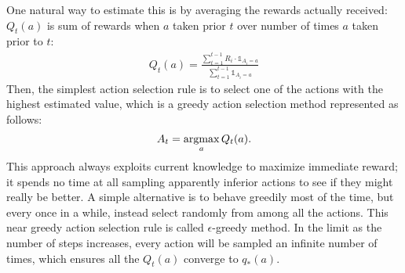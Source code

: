 One natural way to estimate this is by averaging the rewards actually received: $Q_t(a)$ is sum of rewards when $a$ taken prior $t$ over number of times $a$ taken prior to $t$:
\begin{align*}
	Q_t(a) = \frac{\sum_{t=1}^{t-1}R_i \cdot \mathds{1}_{A_i=a}}{\sum_{t=1}^{t-1}\mathds{1}_{A_i=a}}
\end{align*}
Then, the simplest action selection rule is to select one of the actions with the highest estimated value, which is a greedy action selection method represented as follows:
$$A_t=\operatorname*{\operatorname{argmax}}_{a}Q_t(a).$$
This approach always exploits current knowledge to maximize immediate reward; it spends no time at all sampling apparently inferior actions to see if they might really be better. A simple alternative is to behave greedily most of the time, but every once in a while, instead select randomly from among all the actions. This near greedy action selection rule is called $\epsilon$-greedy method. In the limit as the number of steps increases, every action will be sampled an infinite number of times, which ensures all the $Q_t(a)$ converge to $q_*(a)$.
